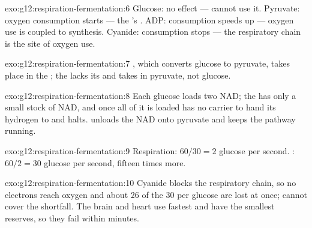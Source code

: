 \begin{solution}{exo:g12:respiration-fermentation:6}
Glucose: no effect ---  cannot use it. Pyruvate: oxygen
consumption starts --- the 's . ADP: consumption
speeds up --- oxygen use is coupled to  synthesis. Cyanide:
consumption stops --- the respiratory chain is the site of oxygen use.
\end{solution}

\begin{solution}{exo:g12:respiration-fermentation:7}
, which converts glucose to pyruvate, takes place in the
; the  lacks its  and takes in pyruvate,
not glucose.
\end{solution}

\begin{solution}{exo:g12:respiration-fermentation:8}
Each glucose loads two NAD; the  has only a small stock of NAD,
and once all of it is loaded  has no carrier to hand its
hydrogen to and halts.  unloads the NAD onto pyruvate and
keeps the pathway running.
\end{solution}

\begin{solution}{exo:g12:respiration-fermentation:9}
Respiration: $60/30 = 2$ glucose per second. : $60/2 = 30$
glucose per second, fifteen times more.
\end{solution}

\begin{solution}{exo:g12:respiration-fermentation:10}
Cyanide blocks the respiratory chain, so no electrons reach oxygen and
about 26 of the 30  per glucose are lost at once; 
cannot cover the shortfall. The brain and heart use  fastest and
have the smallest reserves, so they fail within minutes.
\end{solution}

